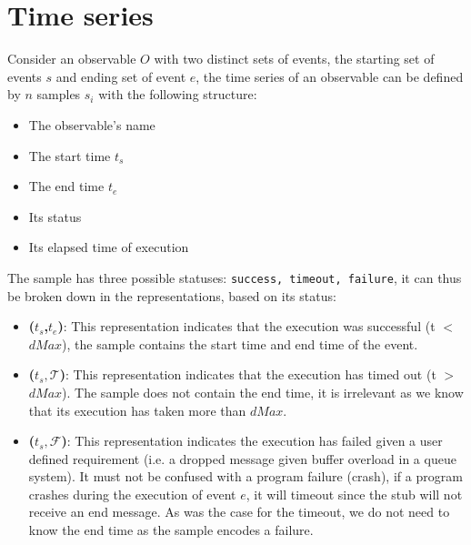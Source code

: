 \section{Time series}
    Consider an observable $O$ with two distinct sets of events, the starting set of events $s$ and ending set of event $e$, the time series of an observable can be defined by $n$ samples $s_i$ with the following structure:
    \begin{itemize}
        \item The observable's name
        \item The start time $t_s$
        \item The end time $t_e$
        \item Its status 
        \item Its elapsed time of execution
    \end{itemize}
    The sample has three possible statuses: \texttt{success, timeout, failure}, it can thus be broken down in the representations, based on its status:
    \begin{itemize}
        \item \textbf{($t_s$,$t_e$)}: This representation indicates that the execution was successful (t $<$ $dMax$), the sample contains the start time and end time of the event.
        \item \textbf{($t_s, \mathcal{T}$)}: This representation indicates that the execution has timed out (t $>$ $dMax$). The sample does not contain the end time, it is irrelevant as we know that its execution has taken more than $dMax$.
            \item \textbf{($t_s, \mathcal{F}$)}: This representation indicates the execution has failed given a user defined requirement (i.e. a dropped message given buffer overload in a queue system). It must not be confused with a program failure (crash), if a program crashes during the execution of event $e$, it will timeout since the stub will not receive an end message. As was the case for the timeout, we do not need to know the end time as the sample encodes a failure.
    \end{itemize}

